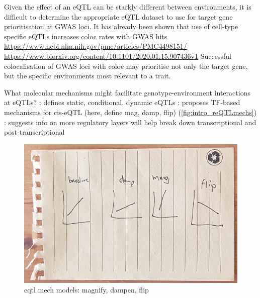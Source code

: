 \begin{outline}
\1 Given the effect of an eQTL can be starkly different between environments, it is difficult to determine the appropriate \gls{eQTL} dataset to use for target gene prioritisation at GWAS loci.
\2 It has already been shown that use of cell-type specific eQTLs increases coloc rates with GWAS hits \autocite{kim-hellmuth2019CellTypeSpecific} \url{https://www.ncbi.nlm.nih.gov/pmc/articles/PMC4498151/} \url{https://www.biorxiv.org/content/10.1101/2020.01.15.907436v1}
    \2 Successful colocalisation of GWAS loci with coloc may prioritise not only the target gene, but the specific environments most relevant to a trait.

\1 What molecular mechanisms might facilitate genotype-environment interactions at \glspl{eQTL}?
    \2 \autocite{ackermann2013ImpactNaturalGenetic}: defines static, conditional, dynamic eQTLs
    \2 \textcite{fu2012UnravelingRegulatoryMechanisms}: proposes TF-based mechanisms for cis-eQTL (here, define mag, damp, flip) (\autoref{fig:intro_reQTLmechs})
    \2 \textcite{gaffney2013GlobalPropertiesFunctional,rotival2019CharacterisingGeneticBasis}: suggests info on more regulatory layers will help break down transcriptional and post-transcriptional

\begin{figure}
    \centering
    \includegraphics[width=1.0\textwidth,page=1]{mainmatter/figures/chapter_01/fig_mockup_reQTLs_Screenshot 2020-05-21 at 17.08.49.png}
    \caption{eqtl mech models: magnify, dampen, flip}
    \label{fig:intro_reQTLmechs}
\end{figure}


\end{outline}
